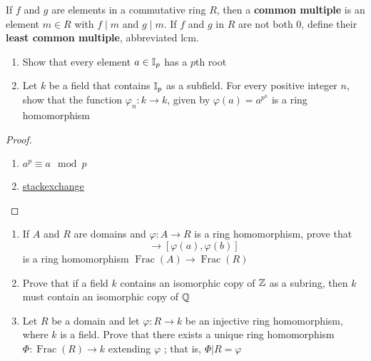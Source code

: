 \documentclass[11pt]{article}
\DeclareMathOperator{\Frac}{Frac}
\begin{document}
\begin{definition}[]
If \(f\) and \(g\) are elements in a commutative ring \(R\), then a \textbf{common multiple}
is an element \(m\in R\) with \(f\mid m\) and \(g\mid m\). If \(f\) and \(g\) in
\(R\) are not both 0, define their \textbf{least common multiple}, abbreviated lcm.
\end{definition}

\begin{exercise}
\label{ex3.45}
\begin{enumerate}
\item Show that every element \(a\in\mathbb{I}_p\) has a \(p\)th root
\item Let \(k\) be a field that contains \(\mathbb{I}_p\) as a subfield. For every
positive integer \(n\), show that the function
\(\varphi_n:k\to k\), given by \(\varphi(a)=a^{p^n}\) is a ring homomorphism
\end{enumerate}
\end{exercise}

\begin{proof}
\begin{enumerate}
\item \(a^p\equiv a\mod p\)
\item \href{https://math.stackexchange.com/questions/565135/finite-fields-existence-of-field-of-order-pn-proof-help}{stackexchange}
\end{enumerate}
\end{proof}

\begin{exercise}
\label{ex3.47}
\begin{enumerate}
\item If \(A\) and \(R\) are domains and \(\varphi:A\to R\) is a ring homomorphism,
prove that 
\begin{equation*}
[a,b]\to [\varphi(a),\varphi(b)]
\end{equation*}
is a ring homomorphism \(\Frac(A)\to\Frac(R)\)
\item Prove that if a field \(k\) contains an isomorphic copy of \(\mathbb{Z}\) as a
subring, then \(k\) must contain an isomorphic copy of \(\mathbb{Q}\)
\item Let \(R\) be a domain and let \(\varphi:R\to k\) be an injective ring
homomorphism, where \(k\) is a field. Prove that there exists a unique ring
homomorphism \(\Phi:\Frac(R)\to k\) extending \(\varphi\) ; that is, \(\Phi|R=\varphi\)
\end{enumerate}
\end{exercise}
\end{document}
